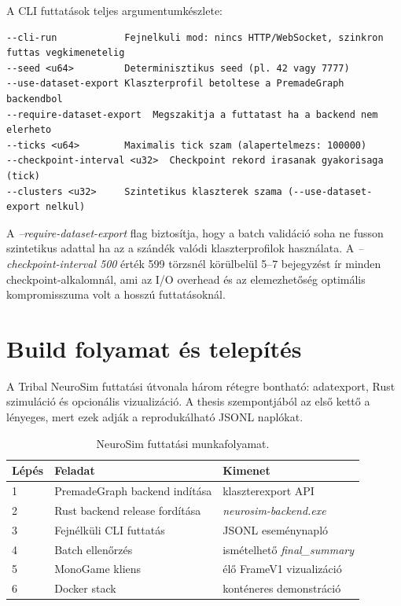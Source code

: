 A CLI futtatások teljes argumentumkészlete:
\begin{lstlisting}[language={},caption={CLI argumentumok és hatásuk}]
--cli-run            Fejnelkuli mod: nincs HTTP/WebSocket, szinkron futtas vegkimenetelig
--seed <u64>         Determinisztikus seed (pl. 42 vagy 7777)
--use-dataset-export Klaszterprofil betoltese a PremadeGraph backendbol
--require-dataset-export  Megszakitja a futtatast ha a backend nem elerheto
--ticks <u64>        Maximalis tick szam (alapertelmezs: 100000)
--checkpoint-interval <u32>  Checkpoint rekord irasanak gyakorisaga (tick)
--clusters <u32>     Szintetikus klaszterek szama (--use-dataset-export nelkul)
\end{lstlisting}

A \textit{--require-dataset-export} flag biztosítja, hogy a batch validáció
soha ne fusson szintetikus adattal ha az a szándék valódi klaszterprofilok használata.
A \textit{--checkpoint-interval 500} érték 599 törzsnél körülbelül 5--7 bejegyzést
ír minden checkpoint-alkalomnál, ami az I/O overhead és az elemezhetőség optimális
kompromisszuma volt a hosszú futtatásoknál.

\section{Build folyamat és telepítés}
\label{sec:neurosim-24-build}

A Tribal NeuroSim futtatási útvonala három rétegre bontható: adatexport,
Rust szimuláció és opcionális vizualizáció. A thesis szempontjából az első kettő
a lényeges, mert ezek adják a reprodukálható JSONL naplókat.

\begin{table}[h]
\centering
\caption{NeuroSim futtatási munkafolyamat.}
\label{tab:neurosim-build-flow}
\begin{tabular}{lll}
\hline
\textbf{Lépés} & \textbf{Feladat} & \textbf{Kimenet} \\
\hline
1 & PremadeGraph backend indítása & klaszterexport API \\
2 & Rust backend release fordítása & \textit{neurosim-backend.exe} \\
3 & Fejnélküli CLI futtatás & JSONL eseménynapló \\
4 & Batch ellenőrzés & ismételhető \textit{final\_summary} \\
5 & MonoGame kliens & élő FrameV1 vizualizáció \\
6 & Docker stack & konténeres demonstráció \\
\hline
\end{tabular}
\end{table}

